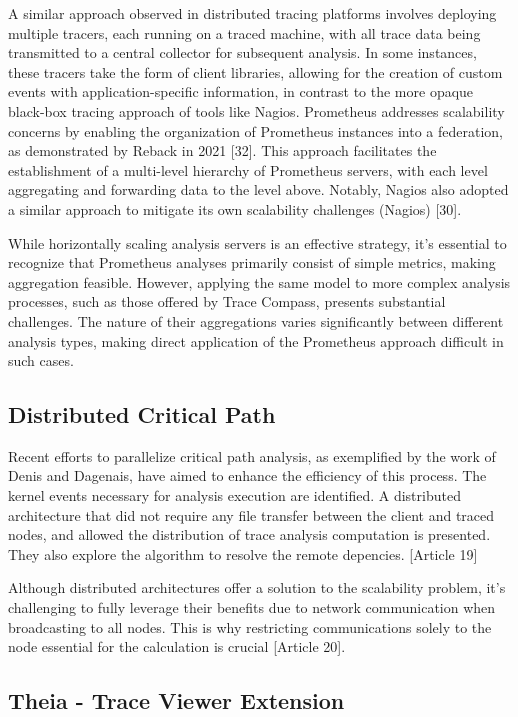 A similar approach observed in distributed tracing platforms involves deploying multiple tracers, each running on a traced machine, with all trace data being transmitted to a central collector for subsequent analysis. In some instances, these tracers take the form of client libraries, allowing for the creation of custom events with application-specific information, in contrast to the more opaque black-box tracing approach of tools like Nagios. Prometheus addresses scalability concerns by enabling the organization of Prometheus instances into a federation, as demonstrated by Reback in 2021 [32]. This approach facilitates the establishment of a multi-level hierarchy of Prometheus servers, with each level aggregating and forwarding data to the level above. Notably, Nagios also adopted a similar approach to mitigate its own scalability challenges (Nagios) [30].

While horizontally scaling analysis servers is an effective strategy, it's essential to recognize that Prometheus analyses primarily consist of simple metrics, making aggregation feasible. However, applying the same model to more complex analysis processes, such as those offered by Trace Compass, presents substantial challenges. The nature of their aggregations varies significantly between different analysis types, making direct application of the Prometheus approach difficult in such cases.

\subsection{Distributed Critical Path}

Recent efforts to parallelize critical path analysis, as exemplified by the work of Denis and Dagenais, have aimed to enhance the efficiency of this process. The kernel events necessary for analysis execution are identified. A distributed architecture that did not require any file transfer between the client and traced nodes, and allowed the distribution of trace analysis computation is presented. They also explore the algorithm to resolve the remote depencies. [Article 19]

Although distributed architectures offer a solution to the scalability problem, it's challenging to fully leverage their benefits due to network communication when broadcasting to all nodes. This is why restricting communications solely to the node essential for the calculation is crucial [Article 20].


\subsection{Theia - Trace Viewer Extension}

